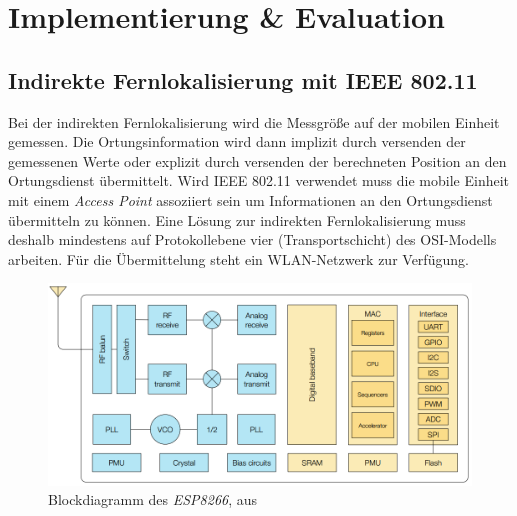 \chapter{Implementierung \& Evaluation}
\label{ch:Implementierung}

\section{Indirekte Fernlokalisierung mit IEEE 802.11}
\label{ch:phase1}
Bei der indirekten Fernlokalisierung wird die Messgröße auf der mobilen Einheit gemessen.
Die Ortungsinformation wird dann implizit durch versenden der gemessenen Werte oder explizit durch versenden der berechneten Position an den Ortungsdienst übermittelt.
Wird IEEE 802.11 verwendet muss die mobile Einheit mit einem \emph{Access Point} assoziiert sein um Informationen an den Ortungsdienst übermitteln zu können.
Eine Lösung zur indirekten Fernlokalisierung muss deshalb mindestens auf Protokollebene vier (Transportschicht) des OSI-Modells arbeiten.
Für die Übermittelung steht ein WLAN-Netzwerk zur Verfügung.

\begin{figure}[h]
  \centering
	\includegraphics[width=\textwidth]{images/espblock.png}
  \caption{Blockdiagramm des \emph{ESP8266}, aus \cite{espressif2017ESP8266}}
  \label{fig:espblock}
\end{figure}


